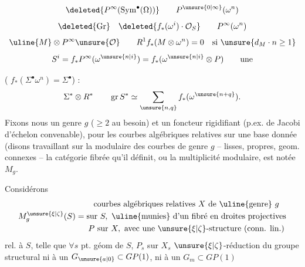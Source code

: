 \[
\deleted{P^\infty(\operatorname{Sym}^\bullet(\Omega))}
\qquad P^{\unsure{0|\infty}}(\omega^n)
\]
\[
\deleted{\operatorname{Gr}}\quad \deleted{f_*(\omega^i)\cdot\mathcal O_S}\qquad P^\infty(\omega^n)
\]
\[
\uline{M}\otimes P^\infty\unsure{\mathcal O}\qquad
R^1f_*(M\otimes\omega^n)=0\quad\text{si }\unsure{d_M\cdot n\ge1}
\]
\quad{}
\[
S^i=f_*P^\infty(\omega^{\unsure{n|i}})=f_*(\omega^{\unsure{n|i}}\otimes P)\qquad\text{une}
\]
\par
{}\par
{} ( $f_*(\Sigma^\bullet\omega^n)=\Sigma^\bullet$)
 :
\[
\Sigma^*\otimes R^*\qquad \operatorname{gr}S^*\simeq\sum_{\unsure{n,q}}f_*(\omega^{\unsure{n+q}}).
\]
Fixons nous un genre $g$ ($\ge2$ au besoin) et un foncteur rigidifiant (p.ex. de Jacobi d'échelon convenable), pour les courbes algébriques relatives sur une base donnée (disons travaillant sur la  modulaire des courbes de genre $g$ -- lisses, propres, geom. connexes -- la catégorie fibrée qu'il définit, ou la multiplicité modulaire, est notée $M_g$.

Considérons
\[
M_g^{\unsure{\xi|\zeta}}(S)=\begin{gathered}
\text{courbes algébriques relatives }X\text{ de \uline{genre} }g\\
\text{sur }S,\ \text{\uline{munies} d'un fibré en droites projectives}\\
P\text{ sur }X,\text{ avec une }\unsure{\xi|\zeta}\text{-structure (conn. lin.)}
\end{gathered}
\]
rel. à $S$, telle que $\forall s$ pt. géom de $S$,  $P_s$ sur $X_s$  $\unsure{\xi|\zeta}$-réduction du groupe structural ni à un $G_{\unsure{a|0}}\subset GP(1)$, ni à un $G_m\subset GP(1)$

